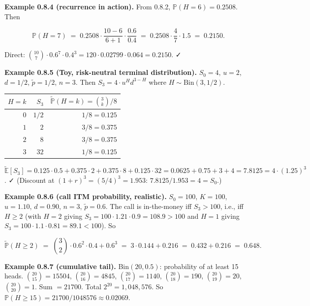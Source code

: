 \documentclass[
  10pt,
  twoside]{book}
\newcounter{none} %
\begin{document}
\textbf{Example 0.8.4 (recurrence in action).} From 0.8.2,
\(\mathbb{P}(H = 6) = 0.2508\). Then

\[\mathbb{P}(H = 7) \;=\; 0.2508 \cdot \frac{10 - 6}{6 + 1} \cdot \frac{0.6}{0.4} \;=\; 0.2508 \cdot \frac{4}{7} \cdot 1.5 \;=\; 0.2150.\]

Direct:
\(\binom{10}{7} \cdot 0.6^7 \cdot 0.4^3 = 120 \cdot 0.02799 \cdot 0.064 = 0.2150\).
✓

\textbf{Example 0.8.5 (Toy, risk-neutral terminal distribution).}
\(S_0 = 4\), \(u = 2\), \(d = 1/2\), \(\tilde p = 1/2\), \(n = 3\). Then
\(S_3 = 4 \cdot u^H d^{3 - H}\) where \(H \sim \mathrm{Bin}(3, 1/2)\).

{\def\LTcaptype{none} %
\begin{table}[H]
\centering
\begin{tabular}{|r|r|r|}
\toprule
\(H = k\) & \(S_3\) & \(\tilde{\mathbb{P}}(H = k) = \binom{3}{k}/8\) \\
\midrule



\(0\) & \(1/2\) & \(1/8 = 0.125\) \\
\(1\) & \(2\) & \(3/8 = 0.375\) \\
\(2\) & \(8\) & \(3/8 = 0.375\) \\
\(3\) & \(32\) & \(1/8 = 0.125\) \\
\bottomrule
\end{tabular}
\end{table}
}

\(\tilde{\mathbb{E}}[S_3] = 0.125 \cdot 0.5 + 0.375 \cdot 2 + 0.375 \cdot 8 + 0.125 \cdot 32 = 0.0625 + 0.75 + 3 + 4 = 7.8125 = 4 \cdot (1.25)^3\).
✓ (Discount at \((1+r)^3 = (5/4)^3 = 1.953\):
\(7.8125 / 1.953 = 4 = S_0\).)

\textbf{Example 0.8.6 (call ITM probability, realistic).} \(S_0 = 100\),
\(K = 100\), \(u = 1.10\), \(d = 0.90\), \(n = 3\), \(\tilde p = 0.6\).
The call is in-the-money iff \(S_3 > 100\), i.e., iff \(H \geq 2\) (with
\(H = 2\) giving \(S_3 = 100 \cdot 1.21 \cdot 0.9 = 108.9 > 100\) and
\(H = 1\) giving \(S_3 = 100 \cdot 1.1 \cdot 0.81 = 89.1 < 100\)). So

\[\tilde{\mathbb{P}}(H \geq 2) \;=\; \binom{3}{2} \cdot 0.6^2 \cdot 0.4 + 0.6^3 \;=\; 3 \cdot 0.144 + 0.216 \;=\; 0.432 + 0.216 \;=\; 0.648.\]

\textbf{Example 0.8.7 (cumulative tail).} Bin\((20, 0.5)\): probability
of at least 15 heads. \(\binom{20}{15} = 15504\),
\(\binom{20}{16} = 4845\), \(\binom{20}{17} = 1140\),
\(\binom{20}{18} = 190\), \(\binom{20}{19} = 20\),
\(\binom{20}{20} = 1\). Sum \(= 21700\). Total
\(2^{20} = 1{,}048{,}576\). So
\(\mathbb{P}(H \geq 15) = 21700/1048576 \approx 0.02069\).
\end{document}
